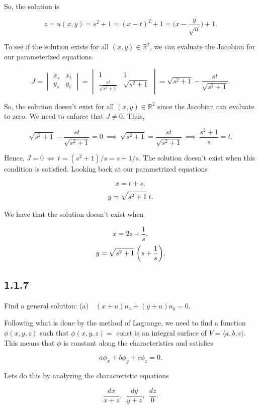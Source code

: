 \documentclass{article}
\begin{document}
\begin{flushleft}
So, the solution is

$$z=u(x,y)=s^2+1=(x-t)^2+1=\bigg(x-\frac{y}{\sqrt{u}}\bigg)+ 1.$$

To see if the solution exists for all $(x,y)\in\mathbb R^2$, we can evaluate the Jacobian for our parameterized equations. 

$$J=\begin{vmatrix}
x_s & x_t \\
y_s & y_t
\end{vmatrix}=\begin{vmatrix}
1 & 1 \\
\frac{st}{\sqrt{s^2+1}} & \sqrt{s^2+1}
\end{vmatrix}=\sqrt{s^2+1} - \frac{st}{\sqrt{s^2+1}}.$$

So, the solution doesn't exist for all $(x,y)\in\mathbb R^2$ since the Jacobian can evaluate to zero. We need to enforce that $J\neq 0$. Thus,

$$\sqrt{s^2+1} - \frac{st}{\sqrt{s^2+1}}=0  ~\implies~ \sqrt{s^2+1} = \frac{st}{\sqrt{s^2+1}} ~\implies~ \frac{s^2+1}{s}=t .$$

Hence, $J=0 ~\iff~ t=(s^2+1)/s= s + 1/s$. The solution doesn't exist when this condition is satisfied. Looking back at our parametrized equations

$$x=t+s,$$
$$y=\sqrt{s^2+1}\hspace{1mm}t.$$

We have that the solution doesn't exist when

$$x=2s+\frac{1}{s},$$
$$y=\sqrt{s^2+1}\hspace{1mm}\bigg(s+\frac{1}{s}\bigg).$$


\subsection{\textbf{1.1.7}} Find a general solution:
\newline (a)~~$(x+u)u_x+(y+u)u_y=0$.

Following what is done by the method of Lagrange, we need to find a function $\phi(x,y,z)$ such that $\phi(x,y,z)=$ const is an integral surface of $V=\langle a,b,c \rangle$. This means that $\phi$ is constant along the characteristics and satisfies

$$a\phi_x+b\phi_y+c\phi_z=0.$$

Let\textsc{}s do this by analyzing the characteristic equations

$$\frac{dx}{x+z}, ~~\frac{dy}{y+z}, ~~ \frac{dz}{0}. $$


\end{flushleft}
\end{document}
